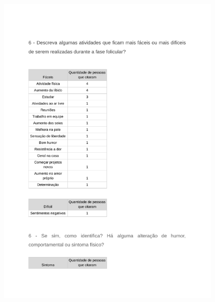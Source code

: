 \begin{apendicesenv}
    \begin{figure}[h]
        \centering
        \includegraphics[keepaspectratio=true,scale=0.7]{figuras/Tab19.pdf}
    \end{figure}
    

\end{apendicesenv}

